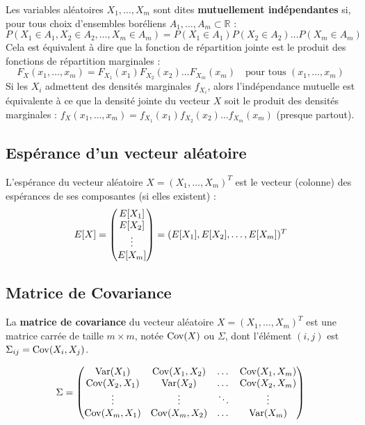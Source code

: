 Les variables aléatoires $X_1, \dots, X_m$ sont dites \textbf{mutuellement indépendantes} si, pour tous choix d'ensembles boréliens $A_1, \dots, A_m \subset \mathbb{R}$ :
\[
P(X_1 \in A_1, X_2 \in A_2, \dots, X_m \in A_m) = P(X_1 \in A_1)P(X_2 \in A_2) \dots P(X_m \in A_m)
\]
Cela est équivalent à dire que la fonction de répartition jointe est le produit des fonctions de répartition marginales :
\[
F_X(x_1, \dots, x_m) = F_{X_1}(x_1)F_{X_2}(x_2) \dots F_{X_m}(x_m) \quad \text{pour tous } (x_1, \dots, x_m)
\]
Si les $X_i$ admettent des densités marginales $f_{X_i}$, alors l'indépendance mutuelle est équivalente à ce que la densité jointe du vecteur $X$ soit le produit des densités marginales : $f_X(x_1, \dots, x_m) = f_{X_1}(x_1)f_{X_2}(x_2) \dots f_{X_m}(x_m)$ (presque partout).
\subsection{Espérance d'un vecteur aléatoire}

L'espérance du vecteur aléatoire $X = (X_1, \dots, X_m)^T$ est le vecteur (colonne) des espérances de ses composantes (si elles existent) :
\[
E[X] = \begin{pmatrix} 
E[X_1] \\ E[X_2] \\ \vdots \\ E[X_m] 
\end{pmatrix} = (E[X_1], E[X_2], \dots, E[X_m])^T
\]

\subsection{Matrice de Covariance}

La \textbf{matrice de covariance} du vecteur aléatoire $X = (X_1, \dots, X_m)^T$ est une matrice carrée de taille $m \times m$, notée $\operatorname{Cov}(X)$ ou $\Sigma$, dont l'élément $(i, j)$ est $\Sigma_{ij} = \operatorname{Cov}(X_i, X_j)$.

\[
\Sigma = \begin{pmatrix}
\operatorname{Var}(X_1) & \operatorname{Cov}(X_1, X_2) & \dots & \operatorname{Cov}(X_1, X_m) \\
\operatorname{Cov}(X_2, X_1) & \operatorname{Var}(X_2) & \dots & \operatorname{Cov}(X_2, X_m) \\
\vdots & \vdots & \ddots & \vdots \\
\operatorname{Cov}(X_m, X_1) & \operatorname{Cov}(X_m, X_2) & \dots & \operatorname{Var}(X_m)
\end{pmatrix}
\]


